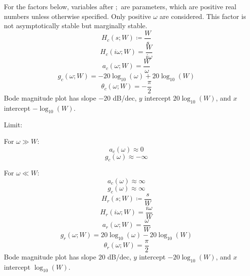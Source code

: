 \documentclass[a4paper,12pt]{report}
\begin{document}
For the factors below, variables after $;$ are parameters, which are positive real numbers unless otherwise specified. Only positive $\omega$ are considered.
This factor is not asymptotically stable but marginally stable.
\[H_c(s;W)\coloneq\frac{W}{s}\]
\[H_c(i\omega;W)=\frac{W}{i\omega}\]
\[a_c(\omega;W)=\frac{W}{\omega}\]
\[g_c(\omega;W)=-20\log_{10}(\omega)+20\log_{10}(W)\]
\[\theta_c(\omega;W)=-\frac{\pi}{2}\]
Bode magnitude plot has slope $-20$ dB/dec, $y$ intercept $20\log_{10}(W)$, and $x$ intercept $-\log_{10}(W)$.

Limit:
\bit
\item For $\omega\gg W$:
\[a_c(\omega)\approx0\]
\[g_c(\omega)\approx -\infty\]
\item For $\omega\ll W$:
\[a_c(\omega)\approx\infty\]
\[g_c(\omega)\approx\infty\]
\eit
{}
\[H_r(s;W)\coloneq\frac{s}{W}\]
\[H_r(i\omega;W)=\frac{i\omega}{W}\]
\[a_r(\omega;W)=\frac{\omega}{W}\]
\[g_r(\omega;W)=20\log_{10}(\omega)-20\log_{10}(W)\]
\[\theta_r(\omega;W)=\frac{\pi}{2}\]
Bode magnitude plot has slope $20$ dB/dec, $y$ intercept $-20\log_{10}(W)$, and $x$ intercept $\log_{10}(W)$.
\end{document}
